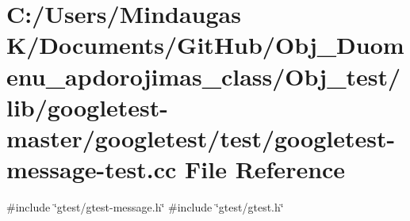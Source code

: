 \hypertarget{_obj__test_2lib_2googletest-master_2googletest_2test_2googletest-message-test_8cc}{}\section{C\+:/\+Users/\+Mindaugas K/\+Documents/\+Git\+Hub/\+Obj\+\_\+\+Duomenu\+\_\+apdorojimas\+\_\+class/\+Obj\+\_\+test/lib/googletest-\/master/googletest/test/googletest-\/message-\/test.cc File Reference}
\label{_obj__test_2lib_2googletest-master_2googletest_2test_2googletest-message-test_8cc}
{\ttfamily \#include \char`\"{}gtest/gtest-\/message.\+h\char`\"{}}\newline
{\ttfamily \#include \char`\"{}gtest/gtest.\+h\char`\"{}}\newline
